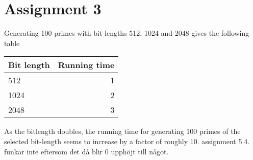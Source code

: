 \documentclass{article}
\begin{document}

\section{Assignment 3}


Generating 100 primes with bit-lengths 512, 1024 and 2048 gives the following table

\begin{tabular}{ l | r }
	Bit length & Running time \\ \hline
	512 & 1 \\
	1024 & 2 \\
	2048 & 3 \\
\end{tabular}

As the bitlength doubles, the running time for generating 100 primes of the selected bit-length seems to increase by a factor of roughly 10.
assignment 5.4. funkar inte eftersom det då blir 0 upphöjt till något.
\end{document}
